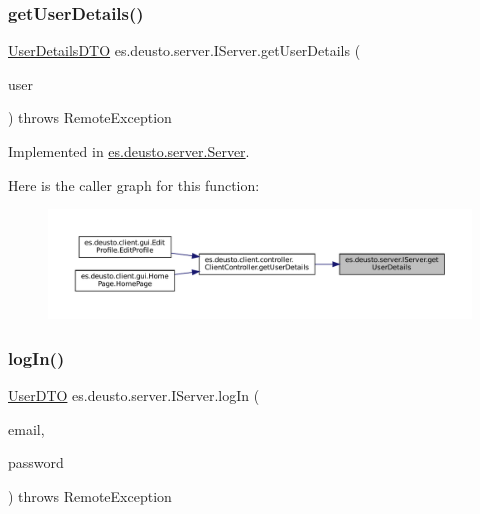 \subsubsection{\texorpdfstring{getUserDetails()}{getUserDetails()}}
{\footnotesize\ttfamily \mbox{\hyperlink{classes_1_1deusto_1_1server_1_1data_1_1_user_details_d_t_o}{User\+Details\+D\+TO}} es.\+deusto.\+server.\+I\+Server.\+get\+User\+Details (\begin{DoxyParamCaption}\item[{\mbox{\hyperlink{classes_1_1deusto_1_1server_1_1data_1_1_user_d_t_o}{User\+D\+TO}}}]{user }\end{DoxyParamCaption}) throws Remote\+Exception}



Implemented in \mbox{\hyperlink{classes_1_1deusto_1_1server_1_1_server_ad742fe9a45edccd8b2309be98a74baae}{es.\+deusto.\+server.\+Server}}.

Here is the caller graph for this function\+:
\nopagebreak
\begin{figure}[H]
\begin{center}
\leavevmode
\includegraphics[width=350pt]{interfacees_1_1deusto_1_1server_1_1_i_server_a2dcd7f0b0e157eb797e20432c0b0e971_icgraph}
\end{center}
\end{figure}
\mbox{\label{interfacees_1_1deusto_1_1server_1_1_i_server_a62db155ac744b9712e303ceea76a3560}} 
\subsubsection{\texorpdfstring{logIn()}{logIn()}}
{\footnotesize\ttfamily \mbox{\hyperlink{classes_1_1deusto_1_1server_1_1data_1_1_user_d_t_o}{User\+D\+TO}} es.\+deusto.\+server.\+I\+Server.\+log\+In (\begin{DoxyParamCaption}\item[{String}]{email,  }\item[{String}]{password }\end{DoxyParamCaption}) throws Remote\+Exception}




